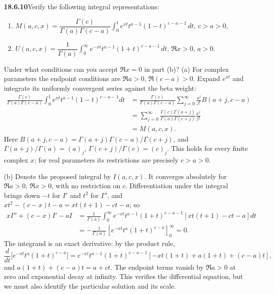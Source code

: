 \par\bigskip
\noindent\textbf{18.6.10}\quad Verify the following integral
representations:
\begin{enumerate}
\item[(a)] $M(a,c,x)=\dfrac{\Gamma(c)}{\Gamma(a)\Gamma(c-a)}
\displaystyle\int_{0}^{1}e^{xt}t^{a-1}(1-t)^{c-a-1}\,dt$,
\quad $c>a>0$,
\item[(b)] $U(a,c,x)=\dfrac{1}{\Gamma(a)}
\displaystyle\int_{0}^{\infty}e^{-xt}t^{a-1}(1+t)^{c-a-1}\,dt$,
\quad $\Re x>0$, $a>0$.
\end{enumerate}
Under what conditions can you accept $\Re x=0$ in part (b)?
\solution
(a) For complex parameters the endpoint conditions are
$\Re a>0$, $\Re(c-a)>0$.  Expand $e^{xt}$ and integrate
its uniformly convergent series against the beta weight:
\begin{align*}
\frac{\Gamma(c)}{\Gamma(a)\Gamma(c-a)}
 \int_0^1e^{xt}t^{a-1}(1-t)^{c-a-1}dt
 &=\frac{\Gamma(c)}{\Gamma(a)\Gamma(c-a)}
   \sum_{j=0}^\infty\frac{x^j}{j!}B(a+j,c-a)\\
 &=\sum_{j=0}^\infty\frac{\Gamma(c)\Gamma(a+j)}
                  {\Gamma(a)\Gamma(c+j)}\frac{x^j}{j!}\\
 &=\boxed{M(a,c,x)}.
\end{align*}
Here $B(a+j,c-a)=\Gamma(a+j)\Gamma(c-a)/\Gamma(c+j)$, and
$\Gamma(a+j)/\Gamma(a)=(a)_j$, $\Gamma(c+j)/\Gamma(c)=(c)_j$.
This holds for every finite complex $x$; for real parameters
its restrictions are precisely $c>a>0$.

(b) Denote the proposed integral by $I(a,c,x)$.  It converges
absolutely for $\Re a>0$, $\Re x>0$, with no restriction on
$c$.  Differentiation under the integral brings down $-t$ for
$I'$ and $t^2$ for $I''$, and $xt^2-(c-x)t-a=xt(t+1)-ct-a$; so
\begin{align*}
xI''+(c-x)I'-aI
 &=\frac1{\Gamma(a)}\int_0^\infty
 e^{-xt}t^{a-1}(1+t)^{c-a-1}
       [xt(t+1)-ct-a]dt\\
 &=-\frac1{\Gamma(a)}
     \left[e^{-xt}t^a(1+t)^{c-a}\right]_0^\infty=0.
\end{align*}
The integrand is an exact derivative: by the product rule,
\[
\frac{d}{dt}\bigl[e^{-xt}t^a(1+t)^{c-a}\bigr]
=e^{-xt}t^{a-1}(1+t)^{c-a-1}[-xt(1+t)+a(1+t)+(c-a)t],
\]
and $a(1+t)+(c-a)t=a+ct$.
The endpoint terms vanish by $\Re a>0$ at zero and exponential
decay at infinity.  This verifies the differential equation, but
we must also identify the particular solution and its scale.

